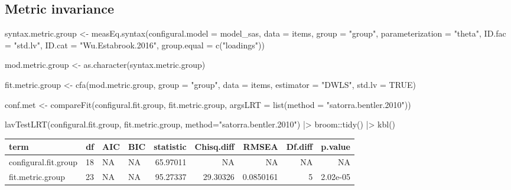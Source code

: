 \documentclass[
  letterpaper,
  DIV=11,
  numbers=noendperiod]{scrreprt}
\newenvironment{Shaded}{\begin{snugshade}}{\end{snugshade}}
\newcommand{\AttributeTok}[1]{\textcolor[rgb]{0.40,0.45,0.13}{#1}}
\newcommand{\ConstantTok}[1]{\textcolor[rgb]{0.56,0.35,0.01}{#1}}
\newcommand{\FunctionTok}[1]{\textcolor[rgb]{0.28,0.35,0.67}{#1}}
\newcommand{\NormalTok}[1]{\textcolor[rgb]{0.00,0.23,0.31}{#1}}
\newcommand{\OtherTok}[1]{\textcolor[rgb]{0.00,0.23,0.31}{#1}}
\newcommand{\SpecialCharTok}[1]{\textcolor[rgb]{0.37,0.37,0.37}{#1}}
\newcommand{\StringTok}[1]{\textcolor[rgb]{0.13,0.47,0.30}{#1}}
\begin{document}
\hypertarget{metric-invariance-1}{%
\subsection{Metric invariance}\label{metric-invariance-1}}

\begin{Shaded}
\begin{Highlighting}[]
\NormalTok{syntax.metric.group }\OtherTok{\textless{}{-}} \FunctionTok{measEq.syntax}\NormalTok{(}\AttributeTok{configural.model =}\NormalTok{ model\_sas,}
                               \AttributeTok{data =}\NormalTok{ items,}
                               \AttributeTok{group =} \StringTok{"group"}\NormalTok{,}
                               \AttributeTok{parameterization =} \StringTok{"theta"}\NormalTok{,}
                               \AttributeTok{ID.fac =} \StringTok{"std.lv"}\NormalTok{, }\AttributeTok{ID.cat =} \StringTok{"Wu.Estabrook.2016"}\NormalTok{,}
                               \AttributeTok{group.equal  =} \FunctionTok{c}\NormalTok{(}\StringTok{"loadings"}\NormalTok{))}

\NormalTok{mod.metric.group }\OtherTok{\textless{}{-}} \FunctionTok{as.character}\NormalTok{(syntax.metric.group)}

\NormalTok{fit.metric.group }\OtherTok{\textless{}{-}} \FunctionTok{cfa}\NormalTok{(mod.metric.group, }\AttributeTok{group =} \StringTok{"group"}\NormalTok{,}
                           \AttributeTok{data =}\NormalTok{ items,}
                           \AttributeTok{estimator =} \StringTok{"DWLS"}\NormalTok{,}
                           \AttributeTok{std.lv =} \ConstantTok{TRUE}\NormalTok{)}

\NormalTok{conf.met }\OtherTok{\textless{}{-}} \FunctionTok{compareFit}\NormalTok{(configural.fit.group, fit.metric.group, }\AttributeTok{argsLRT =} \FunctionTok{list}\NormalTok{(}\AttributeTok{method =} \StringTok{"satorra.bentler.2010"}\NormalTok{))}


\FunctionTok{lavTestLRT}\NormalTok{(configural.fit.group, fit.metric.group, }\AttributeTok{method=}\StringTok{"satorra.bentler.2010"}\NormalTok{) }\SpecialCharTok{|\textgreater{}} 
\NormalTok{  broom}\SpecialCharTok{::}\FunctionTok{tidy}\NormalTok{() }\SpecialCharTok{|\textgreater{}} 
  \FunctionTok{kbl}\NormalTok{()}
\end{Highlighting}
\end{Shaded}

\begin{tabular}[t]{l|r|l|l|r|r|r|r|r}
\hline
term & df & AIC & BIC & statistic & Chisq.diff & RMSEA & Df.diff & p.value\\
\hline
configural.fit.group & 18 & NA & NA & 65.97011 & NA & NA & NA & NA\\
\hline
fit.metric.group & 23 & NA & NA & 95.27337 & 29.30326 & 0.0850161 & 5 & 2.02e-05\\
\hline
\end{tabular}
\end{document}
